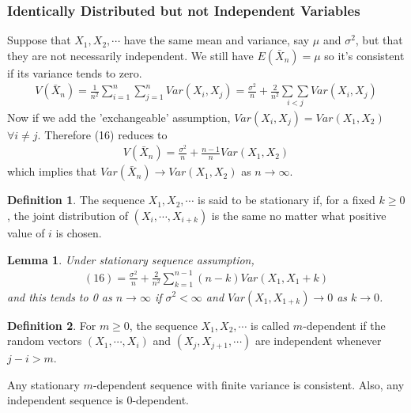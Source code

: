 \documentclass[12pt]{article}
\renewcommand{\=}[1]{\stackrel{#1}{=}} %
\newtheorem*{lem}{Lemma}
\theoremstyle{definition}
\newtheorem*{dfn}{Definition}
\begin{document}
\subsubsection{Identically Distributed but not Independent Variables}
Suppose that $X_1,X_2,\cdots$ have the same mean and variance, say $\mu$ and $\sigma^2$, but that they are not necessarily independent. We still have $E(\bar{X}_n)=\mu$ so it's consistent if its variance tends to zero.
\begin{align}
V(\bar{X}_n)=\frac{1}{n^2}\sum_{i=1}^n\sum_{j=1}^nVar(X_i,X_j)=\frac{\sigma^2}{n}+\frac{2}{n^2}\underset{i<j}{\sum\sum}Var(X_i,X_j)
\end{align}
Now if we add the 'exchangeable' assumption, $Var(X_i,X_j)=Var(X_1,X_2)$ $\forall i\neq j$. Therefore (16) reduces to
\begin{align}
V(\bar{X}_n)=\frac{\sigma^2}{n}+\frac{n-1}{n}Var(X_1,X_2)
\end{align}
which implies that $Var(\bar{X}_n)\overset{}{\rightarrow}Var(X_1,X_2)$ as $n\overset{}{\rightarrow}\infty$.
\begin{dfn}
	The sequence $X_1,X_2,\cdots$ is said to be stationary if, for a fixed $k\geq0$, the joint distribution of $(X_i,\cdots,X_{i+k})$ is the same no matter what positive value of $i$ is chosen.
\end{dfn}
\begin{lem}
	Under stationary sequence assumption,
	\begin{align}
	(16)=\frac{\sigma^2}{n}+\frac{2}{n^2}\sum_{k=1}^{n-1}(n-k)Var(X_1,X_1+k)
	\end{align}
	and this tends to 0 as $n\overset{}{\rightarrow}\infty$ if $\sigma^2<\infty$ and $Var(X_1,X_{1+k})\overset{}{\rightarrow}0$ as $k\overset{}{\rightarrow}0$.
\end{lem}
\begin{dfn}
	For $m\geq0$, the sequence $X_1,X_2,\cdots$ is called $m$-dependent if the random vectors $(X_1,\cdots,X_i)$ and $(X_j,X_{j+1},\cdots)$ are independent whenever $j-i>m$.
\end{dfn}
Any stationary $m$-dependent sequence with finite variance is consistent. Also, any independent sequence is 0-dependent.
\end{document}
